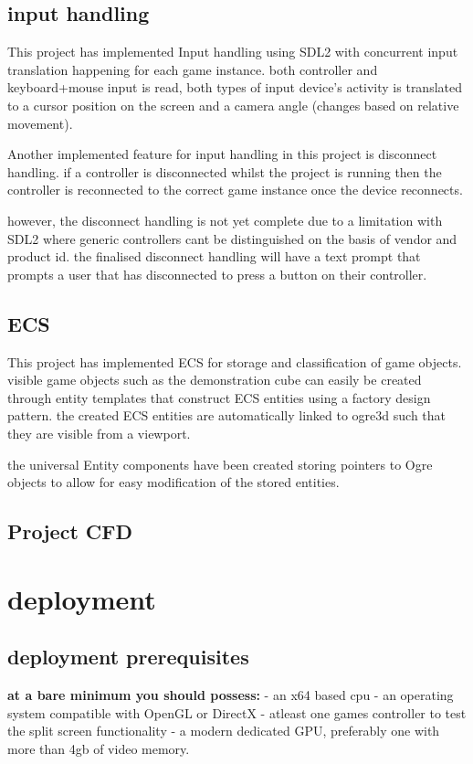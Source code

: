 \documentclass[]{final_report}
\begin{document}
\section{input handling}
This project has implemented Input handling using SDL2 with concurrent input translation happening for each game instance. both controller and keyboard+mouse input is read, both types of input device's activity is translated to a cursor position on the screen and a camera angle (changes based on relative movement).

Another implemented feature for input handling in this project is disconnect handling. if a controller is disconnected whilst the project is running then the controller is reconnected to the correct game instance once the device reconnects. 

however, the disconnect handling is not yet complete due to a limitation with SDL2 where generic controllers cant be distinguished on the basis of vendor and product id. the finalised disconnect handling will have a text prompt that prompts a user that has disconnected to press a button on their controller.
\section{ECS}
This project has implemented ECS for storage and classification of game objects. visible game objects such as the demonstration cube can easily be created through entity templates that construct ECS entities using a factory design pattern. the created ECS entities are automatically linked to ogre3d such that they are visible from a viewport.

the universal Entity components have been created storing pointers to Ogre objects to allow for easy modification of the stored entities.  

\section{Project CFD}
\chapter {deployment}
\section {deployment prerequisites}
 
\textbf{at a bare minimum you should possess:} \newline
- an x64 based cpu 
- an operating system compatible with OpenGL or DirectX
- atleast one games controller to test the split screen functionality
- a modern dedicated GPU, preferably one with more than 4gb of video memory.
 
\end{document}
